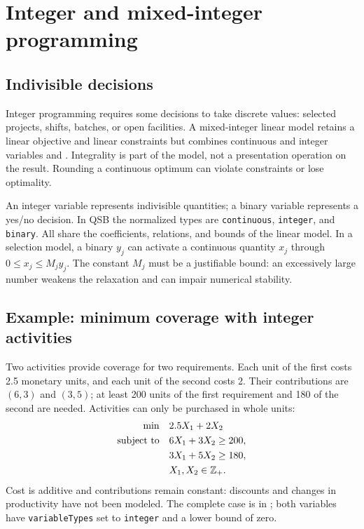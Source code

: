 \chapter{Integer and mixed-integer programming}
\label{chap:entera}

\section{Indivisible decisions}
Integer programming requires some decisions to take discrete values:
selected projects, shifts, batches, or open facilities. A mixed-integer linear
model retains a linear objective and linear constraints but combines
continuous and integer variables \cite{nemhauser1988integer} and \cite{wolsey1998integer}.
Integrality is part of the model, not a presentation operation on the result.
Rounding a continuous optimum can violate constraints or lose optimality.

An integer variable represents indivisible quantities; a binary variable
represents a yes/no decision. In QSB the normalized types are \texttt{continuous},
\texttt{integer}, and \texttt{binary}. All share the coefficients, relations, and
bounds of the linear model. In a selection model, a binary \(y_j\) can activate
a continuous quantity \(x_j\) through \(0\leq x_j\leq M_jy_j\).
The constant \(M_j\) must be a justifiable bound: an excessively large number
weakens the relaxation and can impair numerical stability.

\section{Example: minimum coverage with integer activities}
Two activities provide coverage for two requirements. Each unit of the
first costs 2.5 monetary units, and each unit of the second costs 2.
Their contributions are \((6,3)\) and \((3,5)\); at least 200 units of the
first requirement and 180 of the second are needed. Activities can only be
purchased in whole units:
\[
\begin{aligned}
 \min\quad &2.5X_1+2X_2\\
 \text{subject to}\quad &6X_1+3X_2\geq200,\\
 &3X_1+5X_2\geq180,\\
 &X_1,X_2\in\mathbb{Z}_+.
\end{aligned}
\]
Cost is additive and contributions remain constant: discounts and changes in
productivity have not been modeled. The complete case is in
; both variables have
\texttt{variableTypes} set to \texttt{integer} and a lower bound of zero.

